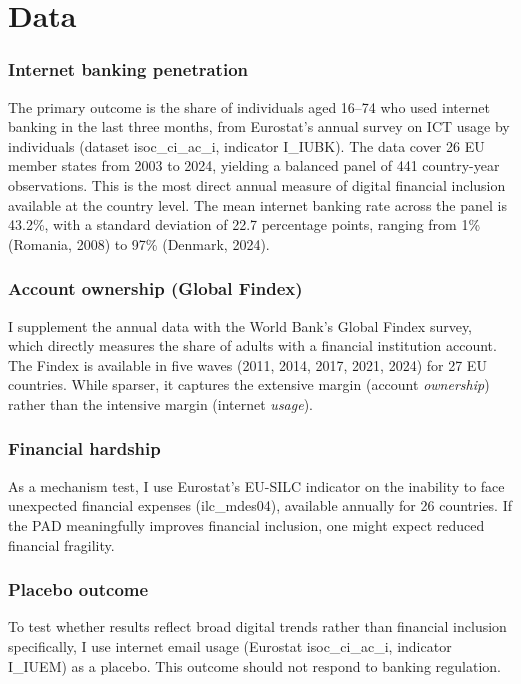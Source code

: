 \documentclass[12pt]{article}
\begin{document}
\section{Data}
\label{sec:data}

\subsubsection*{Internet banking penetration} The primary outcome is the share of individuals aged 16--74 who used internet banking in the last three months, from Eurostat's annual survey on ICT usage by individuals (dataset isoc\_ci\_ac\_i, indicator I\_IUBK). The data cover 26 EU member states from 2003 to 2024, yielding a balanced panel of 441 country-year observations. This is the most direct annual measure of digital financial inclusion available at the country level. The mean internet banking rate across the panel is 43.2\%, with a standard deviation of 22.7 percentage points, ranging from 1\% (Romania, 2008) to 97\% (Denmark, 2024).

\subsubsection*{Account ownership (Global Findex)} I supplement the annual data with the World Bank's Global Findex survey, which directly measures the share of adults with a financial institution account. The Findex is available in five waves (2011, 2014, 2017, 2021, 2024) for 27 EU countries. While sparser, it captures the extensive margin (account \emph{ownership}) rather than the intensive margin (internet \emph{usage}).

\subsubsection*{Financial hardship} As a mechanism test, I use Eurostat's EU-SILC indicator on the inability to face unexpected financial expenses (ilc\_mdes04), available annually for 26 countries. If the PAD meaningfully improves financial inclusion, one might expect reduced financial fragility.

\subsubsection*{Placebo outcome} To test whether results reflect broad digital trends rather than financial inclusion specifically, I use internet email usage (Eurostat isoc\_ci\_ac\_i, indicator I\_IUEM) as a placebo. This outcome should not respond to banking regulation.
\end{document}
